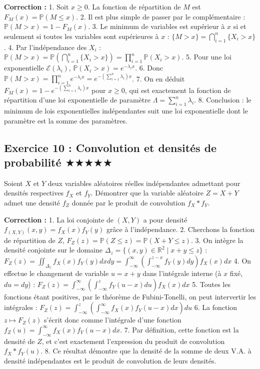 \documentclass[11pt,a4paper]{article}
\begin{document}
\textbf{Correction :}
1. Soit $x \ge 0$. La fonction de répartition de $M$ est $F_M(x) = \mathbb{P}(M \le x)$.
2. Il est plus simple de passer par le complémentaire : $\mathbb{P}(M > x) = 1 - F_M(x)$.
3. Le minimum de variables est supérieur à $x$ si et seulement si toutes les variables sont supérieures à $x$ :
   $\{M > x\} = \bigcap_{i=1}^n \{X_i > x\}$.
4. Par l'indépendance des $X_i$ :
   $\mathbb{P}(M > x) = \mathbb{P}\left(\bigcap_{i=1}^n \{X_i > x\}\right) = \prod_{i=1}^n \mathbb{P}(X_i > x)$.
5. Pour une loi exponentielle $\mathcal{E}(\lambda_i)$, $\mathbb{P}(X_i > x) = e^{-\lambda_i x}$.
6. Donc $\mathbb{P}(M > x) = \prod_{i=1}^n e^{-\lambda_i x} = e^{-(\sum_{i=1}^n \lambda_i) x}$.
7. On en déduit $F_M(x) = 1 - e^{-(\sum_{i=1}^n \lambda_i) x}$ pour $x \ge 0$, qui est exactement la fonction de répartition d'une loi exponentielle de paramètre $\Lambda = \sum_{i=1}^n \lambda_i$.
8. Conclusion : le minimum de lois exponentielles indépendantes suit une loi exponentielle dont le paramètre est la somme des paramètres.

\subsection*{Exercice 10 : Convolution et densités de probabilité \quad $\bigstar\bigstar\bigstar\bigstar\bigstar$}

Soient $X$ et $Y$ deux variables aléatoires réelles indépendantes admettant pour densités respectives $f_X$ et $f_Y$. Démontrer que la variable aléatoire $Z = X + Y$ admet une densité $f_Z$ donnée par le produit de convolution $f_X * f_Y$.

\textbf{Correction :}
1. La loi conjointe de $(X, Y)$ a pour densité $f_{(X,Y)}(x, y) = f_X(x)f_Y(y)$ grâce à l'indépendance.
2. Cherchons la fonction de répartition de $Z$, $F_Z(z) = \mathbb{P}(Z \le z) = \mathbb{P}(X + Y \le z)$.
3. On intègre la densité conjointe sur le domaine $\Delta_z = \{(x, y) \in \mathbb{R}^2 \mid x + y \le z\}$ :
   $F_Z(z) = \iint_{\Delta_z} f_X(x)f_Y(y) dx dy = \int_{-\infty}^{\infty} \left( \int_{-\infty}^{z - x} f_Y(y) dy \right) f_X(x) dx$
4. On effectue le changement de variable $u = x + y$ dans l'intégrale interne (à $x$ fixé, $du = dy$) :
   $F_Z(z) = \int_{-\infty}^{\infty} \left( \int_{-\infty}^{z} f_Y(u - x) du \right) f_X(x) dx$
5. Toutes les fonctions étant positives, par le théorème de Fubini-Tonelli, on peut intervertir les intégrales :
   $F_Z(z) = \int_{-\infty}^{z} \left( \int_{-\infty}^{\infty} f_X(x)f_Y(u - x) dx \right) du$
6. La fonction $z \mapsto F_Z(z)$ s'écrit donc comme l'intégrale d'une fonction $f_Z(u) = \int_{-\infty}^{\infty} f_X(x)f_Y(u - x) dx$.
7. Par définition, cette fonction est la densité de $Z$, et c'est exactement l'expression du produit de convolution $f_X * f_Y(u)$.
8. Ce résultat démontre que la densité de la somme de deux V.A. à densité indépendantes est le produit de convolution de leurs densités.
\end{document}
